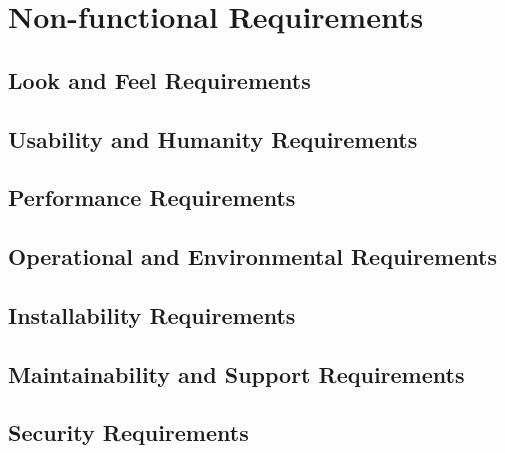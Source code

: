 \documentclass[11pt]{article} %
\begin{document}
\begin{enumerate}[{VP}1.]
\end{enumerate}


\section{Non-functional Requirements}

\subsection{Look and Feel Requirements}

\subsection{Usability and Humanity Requirements}

\subsection{Performance Requirements}

\subsection{Operational and Environmental Requirements}

\subsection{Installability Requirements}

\subsection{Maintainability and Support Requirements}

\subsection{Security Requirements}
\end{document}
